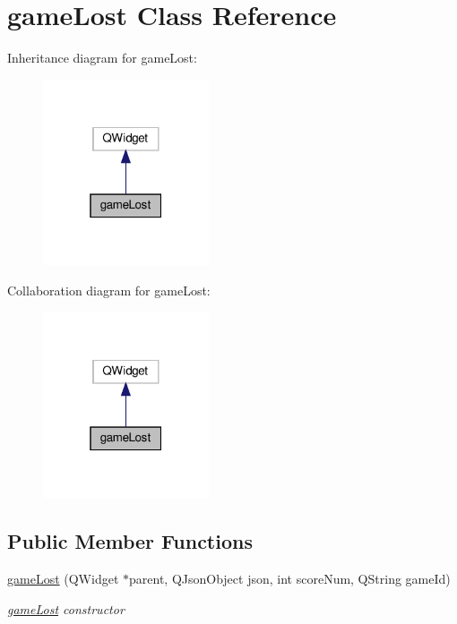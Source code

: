 \hypertarget{classgameLost}{}\section{game\+Lost Class Reference}
\label{classgameLost}


Inheritance diagram for game\+Lost\+:
\nopagebreak
\begin{figure}[H]
\begin{center}
\leavevmode
\includegraphics[width=139pt]{classgameLost__inherit__graph}
\end{center}
\end{figure}


Collaboration diagram for game\+Lost\+:
\nopagebreak
\begin{figure}[H]
\begin{center}
\leavevmode
\includegraphics[width=139pt]{classgameLost__coll__graph}
\end{center}
\end{figure}
\subsection*{Public Member Functions}
\begin{DoxyCompactItemize}
\item 
\hyperlink{classgameLost_a845db0684130309120016d977920af72}{game\+Lost} (Q\+Widget $\ast$parent, Q\+Json\+Object json, int score\+Num, Q\+String game\+Id)
\begin{DoxyCompactList}\small\item\em \hyperlink{classgameLost}{game\+Lost} constructor \end{DoxyCompactList}\end{DoxyCompactItemize}


